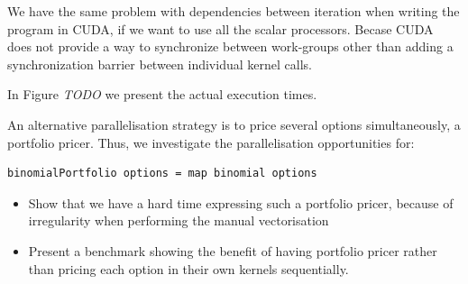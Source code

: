 \documentclass[preprint]{sigplanconf}
\begin{document}
We have the same problem with dependencies between iteration when
writing the program in CUDA, if we want to use all the scalar
processors. Becase CUDA does not provide a way to synchronize between
work-groups other than adding a synchronization barrier between
individual kernel calls.

In Figure \emph{TODO} we present the actual execution times.

An alternative parallelisation strategy is to price several
options simultaneously, a portfolio pricer. Thus, we investigate
the parallelisation opportunities for:
\begin{verbatim}
binomialPortfolio options = map binomial options
\end{verbatim}


\begin{itemize}
\item Show that we have a hard time expressing such a portfolio
  pricer, because of irregularity when performing the manual
  vectorisation
\item Present a benchmark showing the benefit of having portfolio
  pricer rather than pricing each option in their own kernels
  sequentially.
\end{itemize}


\end{document}
